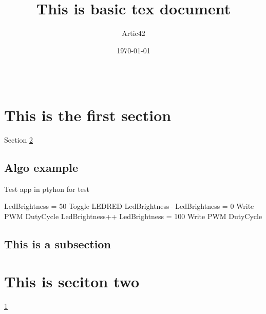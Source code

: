 \def\MYTITLE{This is basic tex document}
\def\MYNAME{Artic42}






    \title{\MYTITLE}
    \author{\MYNAME}
    \date{\today}
    \maketitle

    \thispagestyle{firstPage}
    \begin{abstract}\
    \lipsum[10]
    \end{abstract}

    \section{This is the first section}
    \label{sec:one}Section \ref{sec:two}
    \lipsum[1]
        \subsection{Algo example}
        \begin{algorithm}[h!]
            \caption{Test app in ptyhon for test}
        \begin{algorithmic}
            \State LedBrightness = 50
                \State Toggle LEDRED
            \EndIf
                \State LedBrightness--
                    \State LedBrightness = 0
                \EndIf
                \State Write PWM DutyCycle
            \EndIf
                \State LedBrightness++
                    \State LedBrightness = 100
                \EndIf
                \State Write PWM DutyCycle
            \EndIf
            \EndWhile
        \end{algorithmic}
        \end{algorithm}
        \subsection{This is a subsection}
        \lipsum[5-6]
    \section{This is seciton two}
    \label{sec:two}\ref{sec:one}
    \lipsum[8-10]
    
